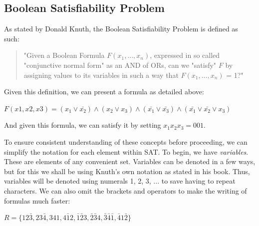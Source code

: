 \documentclass{article}
\begin{document}
\subsection{Boolean Satisfiability Problem}
As stated by Donald Knuth, the Boolean Satisfiability Problem is defined as such:

\begin{quotation}
    "Given a Boolean Formula $F(x_1,...,x_n)$, expressed in so called "conjunctive normal form" as an AND of ORs, can we "satisfy" $F$ by assigning values to its variables in such a way that $F(x_1,...,x_n)$ = 1?"
\end{quotation}

Given this definition, we can present a formula as detailed above:

\begin{center}
    $F(x1,x2,x3) = (x_1 \vee \bar{x_2}) \wedge (x_2 \vee x_3) \wedge (\bar{x_1} \vee \bar{x_3}) \wedge (\bar{x_1} \vee \bar{x_2} \vee x_3)$
\end{center}

And given this formula, we can satisfy it by setting $x_1x_2x_3 = 001$.

To ensure consistent understanding of these concepts before proceeding, we can simplify the notation
for each element within SAT. To begin, we have \textit{variables}. These are elements of any
convenient set. Variables can be denoted in a few ways, but for this we shall be using Knuth's own
notation as stated in his book. Thus, variables will be denoted using numerals 1, 2, 3, ... to save
having to repeat characters. We can also omit the brackets and operators to make the writing of
formulas much faster:

\begin{center}
    $R = \{12\bar{3},23\bar{4},341,4\bar{1}2,\bar{1}\bar{2}3,\bar{2}\bar{3}4,\bar{3}\bar{4}\bar{1},\bar{4}1\bar{2}\}$
\end{center}
\end{document}
